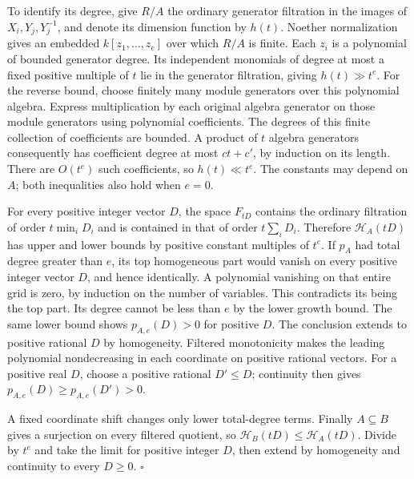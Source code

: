 \documentclass[
  11pt,
  a4paper,
]{article}
\begin{document}
To identify its degree, give \(R/A\) the ordinary generator filtration
in the images of \(X_i,Y_j,Y_j^{-1}\), and denote its dimension function
by \(h(t)\). Noether normalization gives an embedded
\(k[z_1,\ldots,z_e]\) over which \(R/A\) is finite. Each \(z_i\) is a
polynomial of bounded generator degree. Its independent monomials of
degree at most a fixed positive multiple of \(t\) lie in the generator
filtration, giving \(h(t)\gg t^e\). For the reverse bound, choose
finitely many module generators over this polynomial algebra. Express
multiplication by each original algebra generator on those module
generators using polynomial coefficients. The degrees of this finite
collection of coefficients are bounded. A product of \(t\) algebra
generators consequently has coefficient degree at most \(ct+c'\), by
induction on its length. There are \(O(t^e)\) such coefficients, so
\(h(t)\ll t^e\). The constants may depend on \(A\); both inequalities
also hold when \(e=0\).

For every positive integer vector \(D\), the space \(F_{tD}\) contains
the ordinary filtration of order \(t\min_iD_i\) and is contained in that
of order \(t\sum_iD_i\). Therefore \(\mathcal H_A(tD)\) has upper and
lower bounds by positive constant multiples of \(t^e\). If \(p_A\) had
total degree greater than \(e\), its top homogeneous part would vanish
on every positive integer vector \(D\), and hence identically. A
polynomial vanishing on that entire grid is zero, by induction on the
number of variables. This contradicts its being the top part. Its degree
cannot be less than \(e\) by the lower growth bound. The same lower
bound shows \(p_{A,e}(D)>0\) for positive \(D\). The conclusion extends
to positive rational \(D\) by homogeneity. Filtered monotonicity makes
the leading polynomial nondecreasing in each coordinate on positive
rational vectors. For a positive real \(D\), choose a positive rational
\(D'\le D\); continuity then gives \(p_{A,e}(D)\ge p_{A,e}(D')>0\).

A fixed coordinate shift changes only lower total-degree terms. Finally
\(A\subseteq B\) gives a surjection on every filtered quotient, so
\(\mathcal H_B(tD)\le\mathcal H_A(tD)\). Divide by \(t^e\) and take the
limit for positive integer \(D\), then extend by homogeneity and
continuity to every \(D\ge0\). \(\square\)
\end{document}
